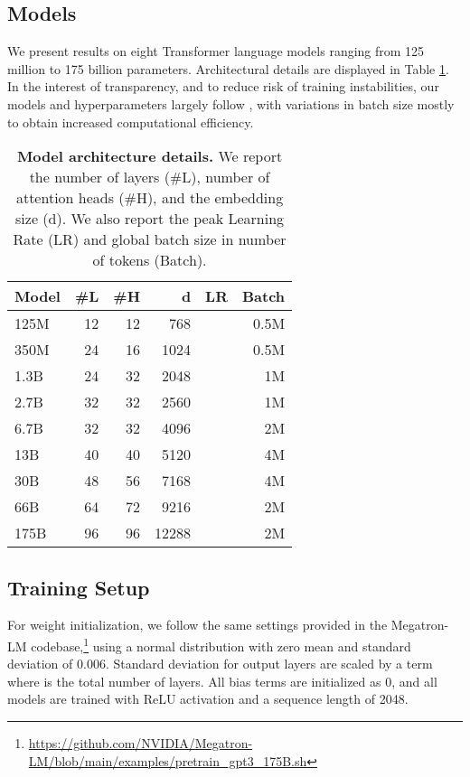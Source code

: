 \documentclass[11pt]{article}
\begin{document}
\subsection{Models}
\label{sec:models}

We present results on eight Transformer language models ranging from 125 million to 175 billion parameters. Architectural details are displayed in Table \ref{tab:model_sizes}. In the interest of transparency, and to reduce risk of training instabilities, our models and hyperparameters largely follow \citet{brown2020gpt3}, with variations in batch size mostly to obtain increased computational efficiency.

\begin{table}[t]
    \centering
    \begin{tabular}{lrrrrr}
    \toprule
    {\bf Model} & {\bf \#L} & {\bf \#H}  & {\bf d} & {\bf LR} & {\bf Batch} \\
    \midrule
        125M    & 12 & 12 & 768   &  & 0.5M \\
        350M    & 24 & 16 & 1024  &  & 0.5M \\
1.3B    & 24 & 32 & 2048  &  & 1M \\
        2.7B    & 32 & 32 & 2560  &  & 1M \\
        6.7B    & 32 & 32 & 4096  &  & 2M \\
        13B     & 40 & 40 & 5120  &  & 4M \\
        30B     & 48 & 56 & 7168  &  & 4M \\
        66B     & 64 & 72 & 9216  &  & 2M \\
        175B    & 96 & 96 & 12288 &  & 2M\\
    \bottomrule
    \end{tabular}
    \caption{{\bf Model architecture details.} We report the number of layers (\#L),
    number of attention heads (\#H), and the embedding size ({d}).
    We also report the peak Learning Rate (LR) and global batch size in number of tokens (Batch).
    }
    \label{tab:model_sizes}
\end{table} \subsection{Training Setup}
\label{sec:training_setup}
For weight initialization, we follow the same settings provided in the Megatron-LM codebase,\footnote{\url{https://github.com/NVIDIA/Megatron-LM/blob/main/examples/pretrain_gpt3_175B.sh}} using a normal distribution with zero mean and standard deviation of 0.006.  Standard deviation for output layers are scaled by a  term where  is the total number of layers. All bias terms are initialized as 0, and all models are trained with ReLU activation and a sequence length of 2048.
\end{document}
